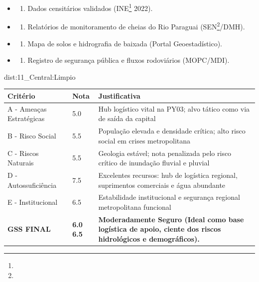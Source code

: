 {\begin{itemize}
\tightlist
\item
  \begin{enumerate}
  \def\labelenumi{\arabic{enumi})}
  \tightlist
  \item
    Dados censitários validados (INE\footnote{\fineINE} 2022).
  \end{enumerate}
\item
  \begin{enumerate}
  \def\labelenumi{\arabic{enumi})}
  \setcounter{enumi}{1}
  \tightlist
  \item
    Relatórios de monitoramento de cheias do Rio Paraguai (SEN\footnote{\fineSEN}/\allowbreak DMH).
  \end{enumerate}
\item
  \begin{enumerate}
  \def\labelenumi{\arabic{enumi})}
  \setcounter{enumi}{2}
  \tightlist
  \item
    Mapa de solos e hidrografia de baixada (Portal Geoestadístico).
  \end{enumerate}
\item
  \begin{enumerate}
  \def\labelenumi{\arabic{enumi})}
  \setcounter{enumi}{3}
  \tightlist
  \item
    Registro de segurança pública e fluxos rodoviários (MOPC/\allowbreak MDI).
  \end{enumerate}
\end{itemize}}{dist:11_Central:Limpio}
\begin{table}[ht!]
\small \begin{tabular}{p{3.0cm}p{0.8cm}p{6.0cm}} \toprule
\textbf{Critério} & \textbf{Nota} & \textbf{Justificativa} \\ \midrule
A - Ameaças Estratégicas & 5.0 & Hub logístico vital na PY03; alvo tático como via de saída da capital \\
B - Risco Social & 5.5 & População elevada e densidade crítica; alto risco social em crises metropolitana \\
C - Riscos Naturais & 5.5 & Geologia estável; nota penalizada pelo risco crítico de inundação fluvial e pluvial \\
D - Autossuficiência & 7.5 & Excelentes recursos: hub de logística regional, suprimentos comerciais e água abundante \\
E - Institucional & 6.5 & Estabilidade institucional e segurança regional metropolitana funcional \\
\midrule \textbf{GSS FINAL} & \textbf{6.0
6.5} & \textbf{Moderadamente Seguro (Ideal como base logística de apoio, ciente dos riscos hidrológicos e demográficos).} \\ \bottomrule \end{tabular}
\end{table}
